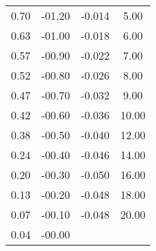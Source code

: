 \begin{table}
\begin{tabular}{c c || c c}
        0.70         &         -01.20  &  -0.014       &           5.00    \\    
        0.63         &         -01.00  &  -0.018       &           6.00    \\    
        0.57         &         -00.90  &  -0.022       &           7.00    \\    
        0.52         &         -00.80  &  -0.026       &           8.00    \\    
        0.47         &         -00.70  &  -0.032       &           9.00    \\    
        0.42         &         -00.60  &  -0.036       &          10.00    \\    
        0.38         &         -00.50  &  -0.040       &          12.00    \\    
        0.24         &         -00.40  &  -0.046       &          14.00    \\    
        0.20         &         -00.30  &  -0.050       &          16.00    \\    
        0.13         &         -00.20  &  -0.048       &          18.00    \\    
        0.07         &         -00.10  &  -0.048       &          20.00    \\    
        0.04         &         -00.00  &               &                    \\
        \bottomrule
    \end{tabular}
\end{table}

